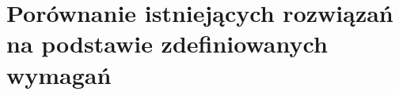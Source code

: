 \documentclass[a4paper,twoside,12pt]{book}
\begin{document}
\section{Porównanie istniejących rozwiązań na podstawie zdefiniowanych wymagań}
%
% 
%
%
%
%
%
%
%
%
%
%
% 
\end{document}
